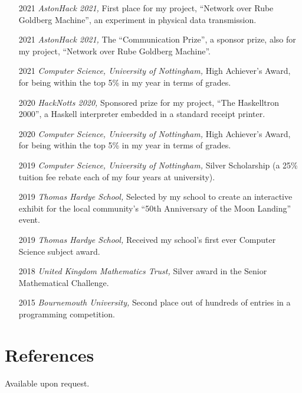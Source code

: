 \documentclass[12pt]{article}
\begin{document}
\begin{itemize}
	\item[2021] \textit{AstonHack 2021,} First place for my project, ``Network over Rube Goldberg Machine'', an experiment in physical data transmission.
	\item[2021] \textit{AstonHack 2021,} The ``Communication Prize'', a sponsor prize, also for my project, ``Network over Rube Goldberg Machine''.
	\item[2021] \textit{Computer Science, University of Nottingham,} High Achiever's Award, for being within the top 5\% in my year in terms of grades.
	\item[2020] \textit{HackNotts 2020,} Sponsored prize for my project, ``The Haskelltron 2000'', a Haskell interpreter embedded in a standard receipt printer.
	\item[2020] \textit{Computer Science, University of Nottingham,} High Achiever's Award, for being within the top 5\% in my year in terms of grades.
	\item[2019] \textit{Computer Science, University of Nottingham,} Silver Scholarship (a 25\% tuition fee rebate each of my four years at university).
	\item[2019] \textit{Thomas Hardye School,} Selected by my school to create an interactive exhibit for the local community's ``50th Anniversary of the Moon Landing'' event.
	\item[2019] \textit{Thomas Hardye School,} Received my school's first ever Computer Science subject award.
	\item[2018] \textit{United Kingdom Mathematics Trust,} Silver award in the Senior Mathematical Challenge.
	\item[2015] \textit{Bournemouth University,} Second place out of hundreds of entries in a programming competition.
\end{itemize}

\section*{References}
Available upon request.

\vfill
\end{document}
